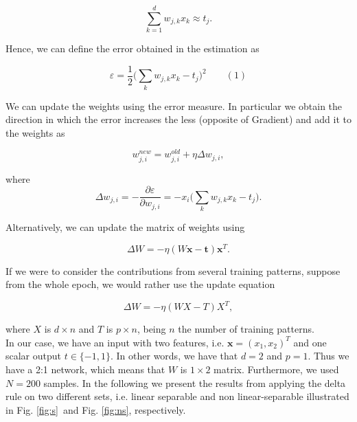 \documentclass[letterpaper, 10 pt, conference]{ieeeconf}  %
\begin{document}
$$
\sum_{k=1}^d w_{j,k} x_k \approx t_j.
$$

Hence, we can define the error obtained in the estimation as 

$$
\varepsilon = \frac{1}{2} \Big(\sum_k w_{j,k} x_k - t_j\Big)^2 \qquad (1)
$$

We can update the weights using the error measure. In particular we obtain the direction in which the error increases the less (opposite of Gradient) and add it to the weights as

$$
w_{j,i}^{new} = w_{j,i}^{old} + \eta \Delta w_{j,i},
$$

where 
$$
\Delta w_{j,i} = -\frac{\partial \varepsilon}{\partial w_{j,i}} = -x_i\Big(\sum_k w_{j,k} x_k - t_j\Big).
$$


%

Alternatively, we can update the matrix of weights using

$$
\Delta W = -\eta (W\textbf{x} - \textbf{t})\textbf{x}^T.
$$

If we were to consider the contributions from several training patterns, suppose from the whole epoch, we would rather use the update equation

$$
\Delta W = -\eta (WX - T){X}^T,
$$

where $X$ is $d\times n$ and $T$ is $p \times n$, being $n$ the number of training patterns. \\

In our case, we have an input with two features, i.e. $\textbf{x} = (x_1, x_2)^T$ and one scalar output $t \in \{-1,1\}$. In other words, we have that $d=2$ and $p=1$. Thus we have a 2:1 network, which means that $W$ is $1\times 2$ matrix. Furthermore, we used $N=200$ samples. In the following we present the results from applying the delta rule on two different sets, i.e. linear separable and non linear-separable illustrated in Fig. \ref{fig:s} and Fig. \ref{fig:ns}, respectively.\\
\end{document}
